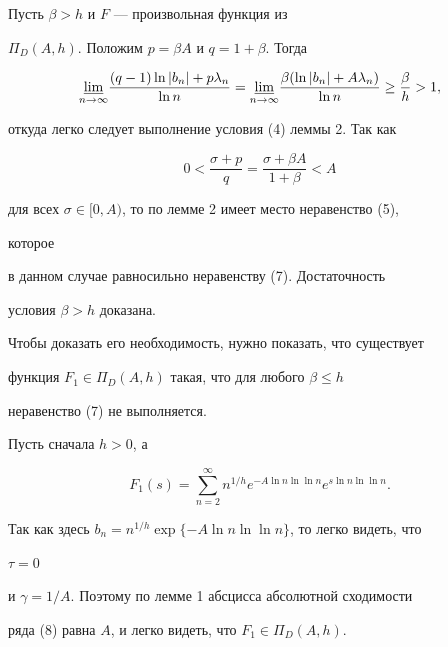 \begin{pf} Пусть $\beta>h$ и $F$ --- произвольная функция из 


$\Pi_D(A,h)$. Положим $p=\beta A$ и $q=1+\beta$. Тогда 


$$ 


\underset{n\to\infty}{\varliminf} 


\frac{(q-1)\ln|b_n|+p\lambda_n}{\ln n}= 


\underset{n\to\infty}{\varliminf} 


\frac{\beta(\ln|b_n|+A\lambda_n)}{\ln n} 


\ge\frac{\beta}{h}>1, 


$$ 


откуда легко следует выполнение условия (4) леммы 2. Так как 


$$ 


0<\frac{\sigma+p}{q}=\frac{\sigma+\beta A}{1+\beta}<A 


$$ 


для всех $\sigma\in[0,A)$, то по лемме 2 имеет место неравенство (5), 


которое 


в данном случае равносильно неравенству (7). Достаточность 


условия $\beta>h$ доказана. 


 


Чтобы доказать его необходимость, нужно показать, что существует 


функция $F_1\in\Pi_D(A,h)$ такая, что для любого $\beta\le h$ 


неравенство (7) не выполняется. 


 


Пусть сначала $h>0$, а 


\begin{equation} 


F_1(s)=\sum^\infty_{n=2}n^{1/h} 


e^{-A\ln n\ln\ln n}e^{s\ln n\ln\ln n}. 


\end{equation} 


Так как здесь $b_n=n^{1/h}\exp\{-A\ln n\ln\ln n\}$, то легко видеть, что 


$\tau=0$ 


и $\gamma=1/A$. Поэтому по лемме 1 абсцисса абсолютной сходимости 


ряда (8) равна $A$, и легко видеть, что $F_1\in\Pi_D(A,h)$. 



\end{pf}
